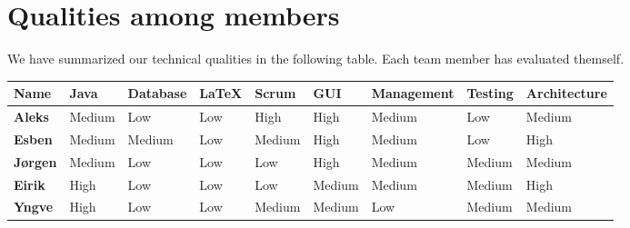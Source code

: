 \section{Qualities among members}

We have summarized our technical qualities in the following table. Each team member has
evaluated themself.
\begin{table}[h]
\begin{center}
\begin{tabular}{|p{1.2cm}|p{1.3cm}|p{1.6cm}|p{0.9cm}|p{1.3cm}|p{1.4cm}|p{2cm}|p{1.4cm}|p{2cm}|}
\hline
\bf{Name} & \bf{Java} & \bf{Database} & \bf{\LaTeX} & \bf{Scrum} & \bf{GUI} &
\bf{Management} & \bf{Testing} & \bf{Architecture} \\
\hline
\bf{Aleks} & Medium & Low & Low & High &	High &	Medium & Low &	Medium \\
\hline \bf{Esben} & Medium & Medium & Low	& Medium & High	& Medium & Low	& High
\\
\hline \bf{Jørgen} & Medium & Low & Low & Low & High &	Medium & Medium & Medium
\\
\hline \bf{Eirik} & High & Low & Low & Low	& Medium	& Medium	& Medium	& High \\
\hline \bf{Yngve} & High & Low &	Low & Medium & Medium & Low & Medium & Medium
\\
\hline

\end{tabular}
\end{center}
\end{table}

